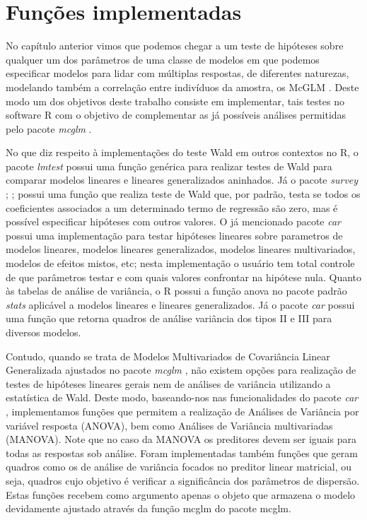 
\chapter{Funções implementadas}

\label{cap:funcoes}


No capítulo anterior vimos que podemos chegar a um teste de hipóteses sobre qualquer um dos parâmetros de uma classe de modelos em que podemos especificar modelos para lidar com múltiplas respostas, de diferentes naturezas, modelando também a correlação entre indivíduos da amostra, os McGLM \citep{Bonat16}. Deste modo um dos objetivos deste trabalho consiste em implementar, tais testes no software R \citep{softwareR} com o objetivo de complementar as já possíveis análises permitidas pelo pacote \emph{mcglm} \citep{mcglm}.

No que diz respeito à implementações do teste Wald em outros contextos no R, o pacote \emph{lmtest} \citep{lmtest} possui uma função genérica para realizar testes de Wald para comparar modelos lineares e lineares generalizados aninhados. Já o pacote \emph{survey} \citep{survey1}; \citep{survey2};\citep{survey3} possui uma função que realiza teste de Wald que, por padrão, testa se todos os coeficientes associados a um determinado termo de regressão são zero, mas é possível especificar hipóteses com outros valores. O já mencionado pacote \emph{car} \citep{car} possui uma implementação para testar hipóteses lineares sobre parametros de modelos lineares, modelos lineares generalizados, modelos lineares multivariados, modelos de efeitos mistos, etc; nesta implementação o usuário tem total controle de que parâmetros testar e com quais valores confrontar na hipótese nula. Quanto às tabelas de análise de variância, o R possui a função anova no pacote padrão \emph{stats} \citep{stats} aplicável a modelos lineares e lineares generalizados. Já o pacote \emph{car} \citep{car} possui uma função que retorna quadros de análise variância dos tipos II e III para diversos modelos. 

Contudo, quando se trata de Modelos Multivariados de Covariância Linear Generalizada ajustados no pacote \emph{mcglm} \citep{mcglm}, não existem opções para realização de testes de hipóteses lineares gerais nem de análises de variância utilizando a estatística de Wald. Deste modo, baseando-nos nas funcionalidades do pacote \emph{car} \citep{car}, implementamos funções que permitem a realização de Análises de Variância por variável resposta (ANOVA), bem como Análises de Variância multivariadas (MANOVA). Note que no caso da MANOVA os preditores devem ser iguais para todas as respostas sob análise. Foram implementadas também funções que geram quadros como os de análise de variância focados no preditor linear matricial, ou seja, quadros cujo objetivo é verificar a significância dos parâmetros de dispersão. Estas funções recebem como argumento apenas o objeto que armazena o modelo devidamente ajustado através da função mcglm do pacote mcglm.

